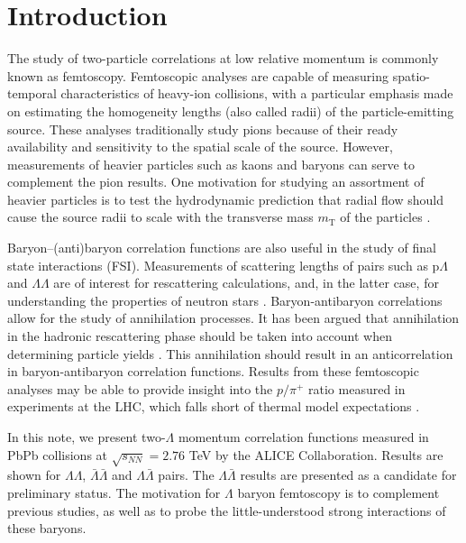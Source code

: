 %




\providecommand{\abs}[1]{\left\lvert#1\right\rvert}
\tableofcontents
\listoffigures
\pagebreak
\section{Introduction}

The study of two-particle correlations at low relative momentum is commonly known as femtoscopy.  Femtoscopic analyses are capable of measuring spatio-temporal characteristics of heavy-ion collisions, with a particular emphasis made on estimating the homogeneity lengths (also called radii) of the particle-emitting source.  These analyses traditionally study pions \cite{Goldhaber:1960sf,Aamodt:2011mr} because of their ready availability and sensitivity to the spatial scale of the source.  However, measurements of heavier particles such as kaons \cite{Abelev:2012ms} and baryons \cite{Gos:2007cj} can serve to complement the pion results.  One motivation for studying an assortment of heavier particles is to test the hydrodynamic prediction that radial flow should cause the source radii to scale with the transverse mass $m_{\mathrm{T}}$ of the particles \cite{Csorgo:1995bi,Lisa:2005dd}.

Baryon--(anti)baryon correlation functions are also useful in the study of final state interactions (FSI).  Measurements of scattering lengths of pairs such as p$\Lambda$ and $\Lambda\Lambda$ are of interest for rescattering calculations, and, in the latter case, for understanding the properties of neutron stars \cite{SchaffnerBielich:2008kb,Wang:2010gr}.  Baryon-antibaryon correlations allow for the study of annihilation processes.  It has been argued that annihilation in the hadronic rescattering phase should be taken into account when determining particle yields \cite{Werner:2012xh,Karpenko:2012yf,Steinheimer:2012rd}.  This annihilation should result in an anticorrelation in baryon-antibaryon correlation functions.  Results from these femtoscopic analyses may be able to provide insight into the $p/\pi^+$ ratio measured in experiments at the LHC, which falls short of thermal model expectations \cite{Preghenella:2012eu}. 

In this note, we present two-$\Lambda$ momentum correlation functions measured in PbPb collisions at $\sqrt{s_{NN}}=2.76$ TeV by the ALICE Collaboration.  Results are shown for $\Lambda\Lambda$, $\bar{\Lambda}\bar{\Lambda}$ and $\Lambda\bar{\Lambda}$ pairs. The $\Lambda\bar{\Lambda}$ results are presented as a candidate for preliminary status. The motivation for $\Lambda$ baryon femtoscopy is to complement previous studies, as well as to probe the little-understood strong interactions of these baryons.


